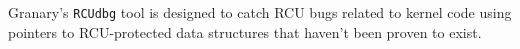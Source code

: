 \documentclass[preprint]{sigplanconf}
\begin{document}

Granary's \texttt{RCUdbg} tool is designed to catch RCU bugs related to kernel code using pointers to RCU-protected data structures that haven't been proven to exist. 







\end{document}
